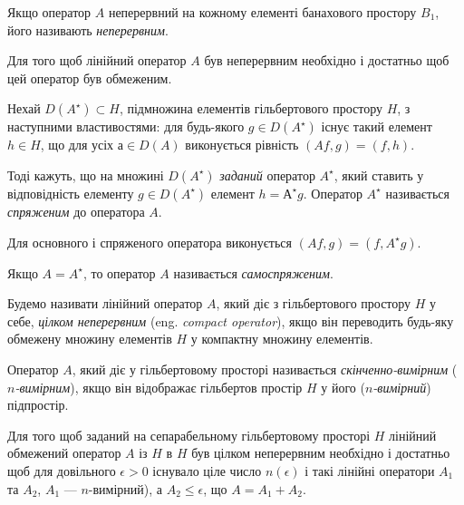 \begin{definition}
    Якщо оператор $A$ неперервний на кожному елементі банахового простору $B_1$, його називають \emph{неперервним}.
\end{definition}

\begin{proposition}
    Для того щоб лінійний оператор $A$ був неперервним необхідно і достатньо щоб цей оператор був обмеженим.
\end{proposition}

\begin{definition}
    Нехай $D(A^\star) \subset H$, підмножина елементів гільбертового простору $H$, з наступними властивостями: для будь-якого $g \in D(A^\star)$ існує такий елемент $h \in H$, що для усіх $а \in D(A)$ виконується рівність $(A f, g) = (f, h)$. \medskip

    Тоді кажуть, що на множині $D(A^\star)$ \emph{заданий} оператор $A^\star$, який ставить у відповідність елементу $g \in D(A^\star)$ елемент $h = А^\star g$. Оператор $A^\star$ називається \emph{спряженим} до оператора $A$.
\end{definition}

\begin{proposition}
    Для основного і спряженого оператора виконується $(A f, g) = (f, A^\star g)$.
\end{proposition}

\begin{definition}
    Якщо $A = A^\star$, то оператор $A$ називається \emph{самоспряженим}.
\end{definition}

\begin{definition}
    Будемо називати лінійний оператор $A$, який діє  з гільбертового простору $H$ у себе, \emph{цілком неперервним} (eng. \emph{compact operator}), якщо він переводить будь-яку обмежену множину елементів $H$ у компактну множину елементів.
\end{definition}

\begin{definition}
    Оператор $A$, який діє у гільбертовому просторі називається \emph{скінченно-вимірним} (\emph{$n$-вимірним}), якщо він відображає гільбертов простір $H$ у його (\emph{$n$-вимірний}) підпростір.
\end{definition}

\begin{theorem}
    Для того щоб заданий на сепарабельному гільбертовому просторі $H$ лінійний обмежений оператор $A$ із $H$ в $H$ був цілком неперервним необхідно і достатньо щоб для довільного $\epsilon > 0$ існувало ціле число $n(\epsilon)$ і такі лінійні оператори $A_1$ та $A_2$, $A_1$ --- $n$-вимірний), а $A_2 \le \epsilon$, що $A = A_1 + A_2$. 
\end{theorem}

